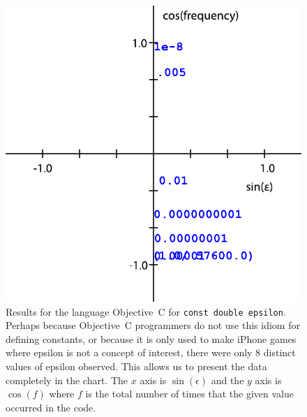\documentclass[twocolumn]{article}
\begin{document}
\begin{figure}[ht]
\begin{center}
\includegraphics[width=0.99 \linewidth]{chart-objectivec}
\end{center}\vspace{-0.1in}
\caption{Results for the language Objective~C for {\tt const double epsilon}.
Perhaps because Objective~C programmers do not use this idiom for defining
constants, or because it is only used to make iPhone games where epsilon is
not a concept of interest, there were only 8 distinct values of epsilon
observed. This allows us to present the data completely in the chart. The
$x$ axis is $\sin(\epsilon)$ and the $y$ axis is $\cos(f)$ where $f$ is
the total number of times that the given value occurred in the code.}
\label{fig:objectivec}
\end{figure}
\end{document}
